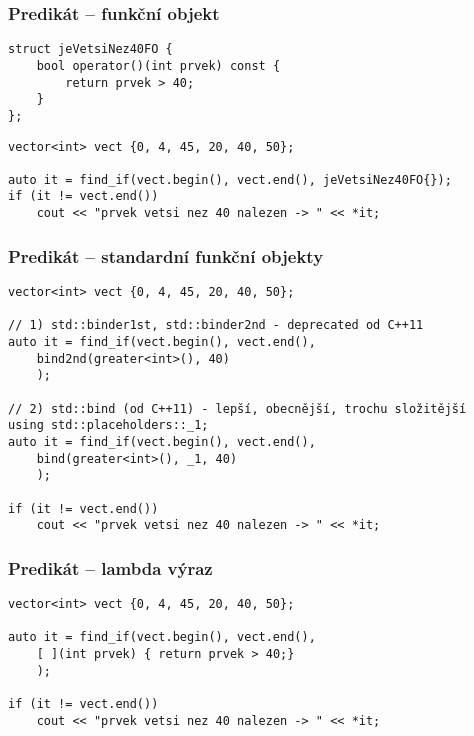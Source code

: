 \begin{frame}[fragile]
\frametitle{Predikát -- funkční objekt}
\begin{yesblock}
\begin{lstlisting}
struct jeVetsiNez40FO {
	bool operator()(int prvek) const {
		return prvek > 40;
	}
};
\end{lstlisting}
\end{yesblock}
\begin{yesblock}
\begin{lstlisting}
vector<int> vect {0, 4, 45, 20, 40, 50};

auto it = find_if(vect.begin(), vect.end(), jeVetsiNez40FO{});
if (it != vect.end()) 
	cout << "prvek vetsi nez 40 nalezen -> " << *it;
\end{lstlisting}
\end{yesblock}
\end{frame}










\begin{frame}[fragile]
\frametitle{Predikát -- standardní funkční objekty}
\begin{yesblock}
\begin{lstlisting}
vector<int> vect {0, 4, 45, 20, 40, 50};

// 1) std::binder1st, std::binder2nd - deprecated od C++11
auto it = find_if(vect.begin(), vect.end(), 
	bind2nd(greater<int>(), 40)
	);
	
// 2) std::bind (od C++11) - lepší, obecnější, trochu složitější
using std::placeholders::_1;
auto it = find_if(vect.begin(), vect.end(), 
	bind(greater<int>(), _1, 40)
	);
	
if (it != vect.end()) 
	cout << "prvek vetsi nez 40 nalezen -> " << *it;
\end{lstlisting}
\end{yesblock}
\end{frame}

\begin{frame}[fragile]
\frametitle{Predikát -- lambda výraz}
\begin{yesblock}
\begin{lstlisting}
vector<int> vect {0, 4, 45, 20, 40, 50};

auto it = find_if(vect.begin(), vect.end(), 
	[ ](int prvek) { return prvek > 40;}
	);

if (it != vect.end()) 
	cout << "prvek vetsi nez 40 nalezen -> " << *it;
\end{lstlisting}
\end{yesblock}
\end{frame}



